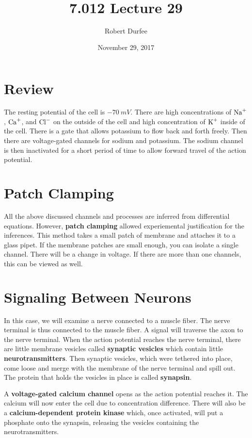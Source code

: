 \documentclass{article}
\title{ 7.012 Lecture 29 }
\author{ Robert Durfee }
\date{ November 29, 2017 }
\begin{document}
\maketitle

\section{ Review }

The resting potential of the cell is $-70\ \si{ mV }$. There are high
concentrations of $\ce{ Na+ }$, $\ce{ Ca+ }$, and $\ce{ Cl- }$ on the outside of
the cell and high concentration of $\ce{ K+ }$ inside of the cell. There is a
gate that allows potassium to flow back and forth freely. Then there are
voltage-gated channels for sodium and potassium. The sodium channel is then
inactivated for a short period of time to allow forward travel of the action
potential. 

\section{ Patch Clamping }

All the above discussed channels and processes are inferred from differential
equations. However, \textbf{patch clamping} allowed experiemental justification
for the inferences. This method takes a small patch of membrane and attaches it
to a glass pipet. If the membrane patches are small enough, you can isolate a
single channel. There will be a change in voltage. If there are more than one
channels, this can be viewed as well.

\section{ Signaling Between Neurons }

In this case, we will examine a nerve connected to a muscle fiber. The nerve
terminal is thus connected to the muscle fiber. A signal will traverse the axon
to the nerve terminal. When the action potential reaches the nerve terminal,
there are little membrane vesicles called \textbf{synaptic vesicles} which
contain little \textbf{neurotransmitters}. Then synaptic vesicles, which were
tethered into place, come loose and merge with the membrane of the nerve
terminal and spill out. The protein that holds the vesicles in place is called
\textbf{synapsin}. 

A \textbf{voltage-gated calcium channel} opens as the action potential
reaches it. The calcium will now enter the cell due to concentration difference.
There will also be a \textbf{calcium-dependent protein kinase} which, once
activated, will put a phosphate onto the synapsin, releasing the vesicles
containing the neurotransmitters. 
\end{document}

